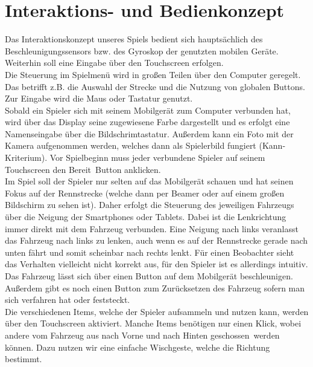 \section{Interaktions- und Bedienkonzept}

Das Interaktionskonzept unseres Spiels bedient sich hauptsächlich des Beschleunigungssensors bzw. des Gyroskop der genutzten mobilen Geräte. Weiterhin soll eine Eingabe über den Touchscreen erfolgen.\\
Die Steuerung im Spielmenü wird in großen Teilen über den Computer geregelt. Das betrifft z.B. die Auswahl der Strecke und die Nutzung von globalen Buttons. Zur Eingabe wird die Maus oder Tastatur genutzt.\\
Sobald ein Spieler sich mit seinem Mobilgerät zum Computer verbunden hat, wird über das Display seine zugewiesene Farbe dargestellt und es erfolgt eine Namenseingabe über die Bildschrimtastatur. Außerdem kann ein Foto mit der Kamera aufgenommen werden, welches dann als Spielerbild fungiert (Kann-Kriterium). Vor Spielbeginn muss jeder verbundene Spieler auf seinem Touchscreen den \glqq Bereit\grqq\ Button anklicken.\\
Im Spiel soll der Spieler nur selten auf das Mobilgerät schauen und hat seinen Fokus auf der Rennstrecke (welche dann per Beamer oder auf einem großen Bildschirm zu sehen ist). Daher erfolgt die Steuerung des jeweiligen Fahrzeugs über die Neigung der Smartphones oder Tablets. Dabei ist die Lenkrichtung immer direkt mit dem Fahrzeug verbunden. Eine Neigung nach links veranlasst das Fahrzeug nach links zu lenken, auch wenn es auf der Rennstrecke gerade nach unten fährt und somit scheinbar nach rechts lenkt. Für einen Beobachter sieht das Verhalten vielleicht nicht korrekt aus, für den Spieler ist es allerdings intuitiv.\\
Das Fahrzeug lässt sich über einen Button auf dem Mobilgerät beschleunigen. Außerdem gibt es noch einen Button zum Zurücksetzen des Fahrzeug sofern man sich verfahren hat oder feststeckt.\\
Die verschiedenen Items, welche der Spieler aufsammeln und nutzen kann, werden über den Touchscreen aktiviert. Manche Items benötigen nur einen Klick, wobei andere vom Fahrzeug aus nach Vorne und nach Hinten \glqq geschossen\grqq\ werden können. Dazu nutzen wir eine einfache Wischgeste, welche die Richtung bestimmt.
